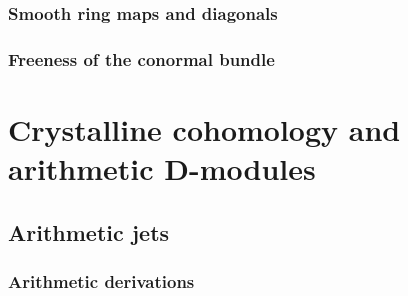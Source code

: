             \subsubsection{Smooth ring maps and diagonals}
            
            \subsubsection{Freeness of the conormal bundle}
        
    \section{Crystalline cohomology and arithmetic D-modules}
        \subsection{Arithmetic jets}
            \subsubsection{Arithmetic derivations}
